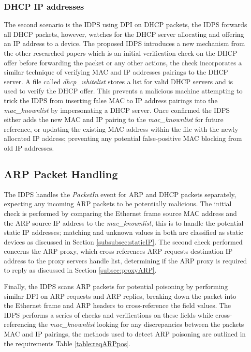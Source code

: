 \documentclass[12pt, oneside]{book}
\begin{document}
\subsubsection{DHCP IP addresses}
The second scenario is the IDPS using DPI on DHCP packets, the IDPS forwards all DHCP packets, however,
watches for the DHCP server allocating and offering an IP address to a device.
The proposed IDPS introduces a new mechanism from the other researched papers which is an initial verification check on the
DHCP offer before forwarding the packet or any other actions,
the check incorporates a similar technique of verifying MAC and IP addresses pairings to the DHCP server. A file called 
\emph{dhcp\_whitelist} stores a list for valid DHCP servers
and is used to verify the DHCP offer. This prevents a malicious machine attempting to trick the IDPS from 
inserting false MAC to IP address pairings into the \emph{mac\_knownlist} by impersonating a DHCP server.
Once confirmed the IDPS either adds the new MAC and IP pairing to the \emph{mac\_knownlist} for future reference,
or updating the existing MAC address within the file with the newly allocated IP address;
preventing any potential false-positive MAC blocking from old IP addresses.


\subsection{ARP Packet Handling}
\label{subsec:ARPPOISDET}
The IDPS handles the \emph{PacketIn} event for ARP and DHCP packets separately, expecting any incoming ARP packets
to be potentially malicious. The initial check is performed by comparing the Ethernet frame source MAC address and the ARP source IP address
to the \emph{mac\_knownlist}, this is to handle the potential static IP addresses; matching and unknown values in both are classified as static 
devices as discussed in Section \ref{subsubsec:staticIP}. The second check performed concerns the ARP proxy,
which cross-references ARP requests destination IP address to the proxy servers handle list, determining
if the ARP proxy is required to reply as discussed in Section \ref{subsec:proxyARP}.

Finally, the IDPS scans ARP packets for potential poisoning by
performing similar DPI on ARP requests and ARP replies, breaking down the packet into the Ethernet frame and ARP headers
to cross-reference the field values. The IDPS performs a series of checks and verifications on these fields while cross-referencing
the \emph{mac\_knownlist} looking for any discrepancies between the packets MAC and IP pairings, the methods used to detect ARP poisoning
are outlined in the requirements Table \ref{table:reqARPpos}.
\end{document}
